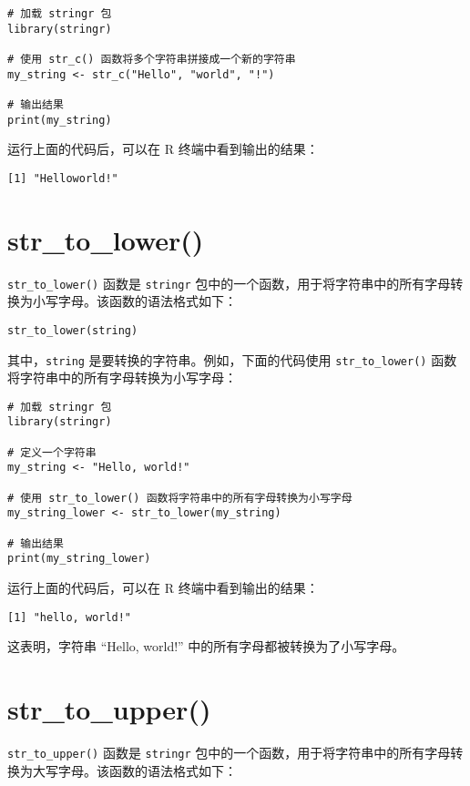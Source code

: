 \documentclass[
  letterpaper,
  DIV=11,
  numbers=noendperiod]{scrreprt}
\begin{document}
\begin{verbatim}
# 加载 stringr 包
library(stringr)

# 使用 str_c() 函数将多个字符串拼接成一个新的字符串
my_string <- str_c("Hello", "world", "!")

# 输出结果
print(my_string)
\end{verbatim}

运行上面的代码后，可以在 R 终端中看到输出的结果：

\begin{verbatim}
[1] "Helloworld!"
\end{verbatim}

\hypertarget{str_to_lower}{%
\section{str\_to\_lower()}\label{str_to_lower}}

\texttt{str\_to\_lower()} 函数是 \texttt{stringr}
包中的一个函数，用于将字符串中的所有字母转换为小写字母。该函数的语法格式如下：

\begin{verbatim}
str_to_lower(string)
\end{verbatim}

其中，\texttt{string} 是要转换的字符串。例如，下面的代码使用
\texttt{str\_to\_lower()} 函数将字符串中的所有字母转换为小写字母：

\begin{verbatim}
# 加载 stringr 包
library(stringr)

# 定义一个字符串
my_string <- "Hello, world!"

# 使用 str_to_lower() 函数将字符串中的所有字母转换为小写字母
my_string_lower <- str_to_lower(my_string)

# 输出结果
print(my_string_lower)
\end{verbatim}

运行上面的代码后，可以在 R 终端中看到输出的结果：

\begin{verbatim}
[1] "hello, world!"
\end{verbatim}

这表明，字符串 ``Hello, world!'' 中的所有字母都被转换为了小写字母。

\hypertarget{str_to_upper}{%
\section{str\_to\_upper()}\label{str_to_upper}}

\texttt{str\_to\_upper()} 函数是 \texttt{stringr}
包中的一个函数，用于将字符串中的所有字母转换为大写字母。该函数的语法格式如下：
\end{document}
